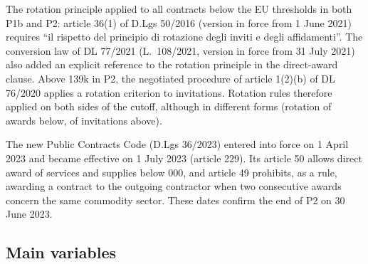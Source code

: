 \documentclass[11pt,a4paper]{article}
\begin{document}
The rotation principle applied to all contracts below the EU thresholds in both P1b and P2: article 36(1) of D.Lgs 50/2016 (version in force from 1 June 2021) requires ``il rispetto del principio di rotazione degli inviti e degli affidamenti''. The conversion law of DL 77/2021 (L.\ 108/2021, version in force from 31 July 2021) also added an explicit reference to the rotation principle in the direct-award clause. Above \texteuro139k in P2, the negotiated procedure of article 1(2)(b) of DL 76/2020 applies a rotation criterion to invitations. Rotation rules therefore applied on both sides of the cutoff, although in different forms (rotation of awards below, of invitations above).

The new Public Contracts Code (D.Lgs 36/2023) entered into force on 1 April 2023 and became effective on 1 July 2023 (article 229). Its article 50 allows direct award of services and supplies below 000, and article 49 prohibits, as a rule, awarding a contract to the outgoing contractor when two consecutive awards concern the same commodity sector. These dates confirm the end of P2 on 30 June 2023.

\subsection{Main variables}
\end{document}
